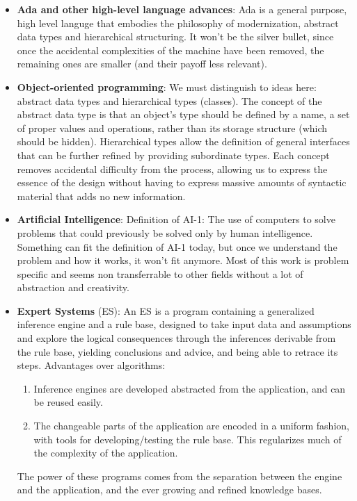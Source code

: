 \documentclass[letterpaper,12pt,parskip=full]{article}
\begin{document}
\begin{itemize}
    \item \textbf{Ada and other high-level language advances}: Ada is a general purpose, high level languge that embodies the philosophy of modernization, abstract data types and hierarchical structuring. It won't be the silver bullet, since once the accidental complexities of the machine have been removed, the remaining ones are smaller (and their payoff less relevant).
    \item \textbf{Object-oriented programming}: We must distinguish to ideas here: abstract data types and hierarchical types (classes). The concept of the abstract data type is that an object's type should be defined by a name, a set of proper values and operations, rather than its storage structure (which should be hidden). Hierarchical types allow the definition of general interfaces that can be further refined by providing subordinate types. Each concept removes accidental difficulty from the process, allowing us to express the essence of the design without having to express massive amounts of syntactic material that adds no new information.
    \item \textbf{Artificial Intelligence}: Definition of AI-1: The use of computers to solve problems that could previously be solved only by human intelligence. Something can fit the definition of AI-1 today, but once we understand the problem and how it works, it won't fit anymore. Most of this work is problem specific and seems non transferrable to other fields without a lot of abstraction and creativity.
    \item \textbf{Expert Systems} (ES): An ES is a program containing a generalized inference engine and a rule base, designed to take input data and assumptions and explore the logical consequences through the inferences derivable from the rule base, yielding conclusions and advice, and being able to retrace its steps. Advantages over algorithms:
    \begin{enumerate}
        \item Inference engines are developed abstracted from the application, and can be reused easily.
        \item The changeable parts of the application are encoded in a uniform fashion, with tools for developing/testing the rule base. This regularizes much of the complexity of the application.
    \end{enumerate}
    The power of these programs comes from the separation between the engine and the application, and the ever growing and refined knowledge bases.

\end{itemize}
\end{document}
